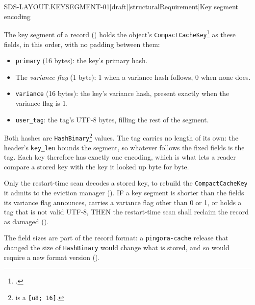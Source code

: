 \begin{requirement}{SDS-LAYOUT.KEYSEGMENT-01}[draft][structuralRequirement]{Key segment encoding}


  The key segment of a record () holds the
  object's
  \texttt{CompactCacheKey}\footnote{.}
  as these fields, in this order, with no padding between them:
  \begin{itemize}
    \item \texttt{primary} (16 bytes): the key's primary hash.
    \item The \emph{variance flag} (1 byte): 1 when a variance hash follows,
      0 when none does.
    \item \texttt{variance} (16 bytes): the key's variance hash, present
      exactly when the variance flag is 1.
    \item \texttt{user\_tag}: the tag's UTF-8 bytes, filling the rest of the
      segment.
  \end{itemize}
  Both hashes are
  \texttt{HashBinary}\footnote{
  is a \texttt{[u8; 16]}.} values. The tag carries no length of its own: the
  header's \texttt{key\_len} bounds the segment, so whatever follows the
  fixed fields is the tag. Each key therefore has exactly one encoding, which
  is what lets a reader compare a stored key with the key it looked up byte
  for byte.

  Only the restart-time scan decodes a stored key, to rebuild the
  \texttt{CompactCacheKey} it admits to the eviction manager
  (). IF a key segment is shorter than the
  fields its variance flag announces, carries a variance flag other than 0 or
  1, or holds a tag that is not valid UTF-8, THEN the restart-time scan shall
  reclaim the record as damaged ().

  The field sizes are part of the record format: a \texttt{pingora-cache}
  release that changed the size of \texttt{HashBinary} would change what is
  stored, and so would require a new format version
  ().



\end{requirement}


